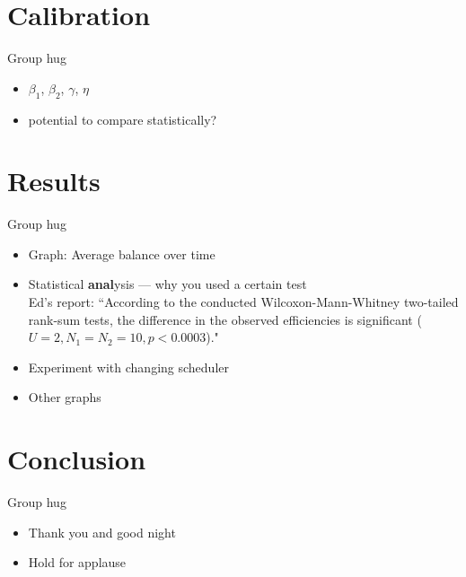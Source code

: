 \documentclass[12pt]{article} %
\begin{document}
\section{Calibration}
Group hug
\begin{itemize} \itemsep0pt
	\item $\beta_1$, $\beta_2$, $\gamma$, $\eta$
	\item potential to compare statistically?
\end{itemize}


\section{Results}
Group hug
\begin{itemize} \itemsep0pt
	\item Graph: Average balance over time
	\item Statistical \textbf{anal}ysis --- why you used a certain test\\
Ed's report: ``According to the conducted Wilcoxon-Mann-Whitney two-tailed rank-sum tests, the difference in the observed efficiencies is significant ($U = 2, N_1 = N_2 = 10, p < 0.0003$)."
	\item Experiment with changing scheduler
	\item Other graphs
\end{itemize}

\section{Conclusion}
Group hug
\begin{itemize} \itemsep0pt
	\item Thank you and good night
	\item Hold for applause
\end{itemize}


%
%
\end{document}
